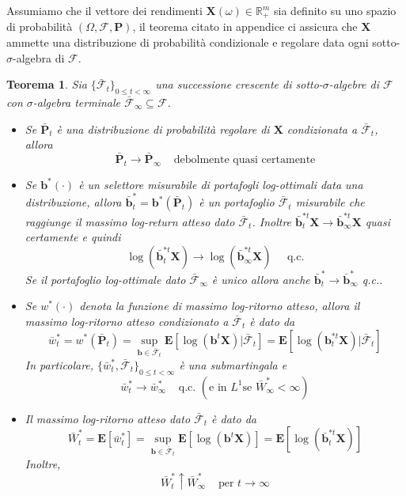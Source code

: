 \documentclass[a4paper,11pt]{book}
\theoremstyle{plain}
\newtheorem{teo}{Teorema}[chapter]
\theoremstyle{definition}
\theoremstyle{remark}
\newcommand{\R}{\mathbb{R}}
\newcommand{\X}{\bm{X}}
\newcommand{\B}{\bm{b}}
\newcommand{\F}{\mathcal{F}}
\newcommand{\Pro}{\mathbf{P}}
\newcommand{\E}{\mathbf{E}}
\begin{document}
Assumiamo che il vettore dei rendimenti $\X(\omega)\in\R^m_+$ sia definito su uno spazio di probabilità $(\Omega,\F,\Pro)$, il teorema citato in appendice ci assicura che $\X$ ammette una distribuzione di probabilità condizionale e regolare data ogni sotto-$\sigma$-algebra di $\F$.
\begin{teo}\label{teo:conv}
	Sia $\{\bar{\F}_t\}_{0\leq t<\infty}$ una successione crescente di sotto-$\sigma$-algebre di $\F$ con  $\sigma$-algebra terminale $\bar{\F}_\infty\subseteq \F$.
	\begin{itemize}
		\item Se $\bar{\Pro}_t$ è una distribuzione di probabilità regolare di $\X$ condizionata a $\bar{\F}_t$, allora
		\begin{equation*}
			\bar{\Pro}_t \rightarrow \bar{\Pro}_\infty \;\;\;\; \text{debolmente quasi certamente}
		\end{equation*}
		\item Se $\B^*(\cdot)$ è un selettore misurabile di portafogli log-ottimali data una distribuzione, allora $\bar{\B}^*_t=\B^*(\bar{\Pro}_t)$ è un portafoglio $\bar{\F}_t$ misurabile che raggiunge il massimo log-return atteso dato $\bar{\F}_t$. Inoltre $\bar{\B}^{*t}_t\X \rightarrow \bar{\B}^{*t}_{\infty}\X$ quasi certamente e quindi
		\begin{equation*}
			\log(\bar{\B}^{*t}_t\X) \rightarrow \log(\bar{\B}^{*t}_{\infty}\X) \;\;\;\;\; \text{q.c.}
		\end{equation*}
		Se il portafoglio log-ottimale dato $\bar{\F}_\infty$ è unico allora anche $\bar{\B}^*_t\rightarrow \bar{\B}^*_\infty$ q.c..
		\item Se $w^*(\cdot)$ denota la funzione di massimo log-ritorno atteso, allora il massimo log-ritorno atteso condizionato a $\bar{\F}_t$ è dato da
		\begin{equation*}
			\bar{w}_t^* = w^*(\bar{\Pro}_t) = \sup\limits_{\B\in \bar{\F}_t} \E[\log(\B^t\X)|\bar{\F}_t] = \E[\log(\B^{*t}_t\X)|\bar{\F}_t]			
		\end{equation*}
		In particolare, $\{\bar{w}_t^*,\bar{\F}_t\}_{0\leq t<\infty}$ è una submartingala e
		\begin{equation*}
			\bar{w}_t^*\rightarrow \bar{w}_\infty^* \;\;\;\; \text{q.c. }  (\text{e in } L^1 \text{se } \bar{W}_\infty^*<\infty )
		\end{equation*}
		\item Il massimo log-ritorno atteso dato $\bar{\F}_t$ è dato da
		\begin{equation*}
			\bar{W}_t^* = \E[\bar{w}^*_t] = \sup\limits_{\B\in \bar{\F}_t} \E[\log(\B^t\X)] = \E[\log(\bar{\B}_t^{*t}\X)]
		\end{equation*}
		Inoltre,
		\begin{equation*}
			\bar{W}_t^*\uparrow \bar{W}^*_\infty \;\;\;\; \text{per } t\rightarrow \infty
		\end{equation*}
	\end{itemize}
\end{teo}
\end{document}

